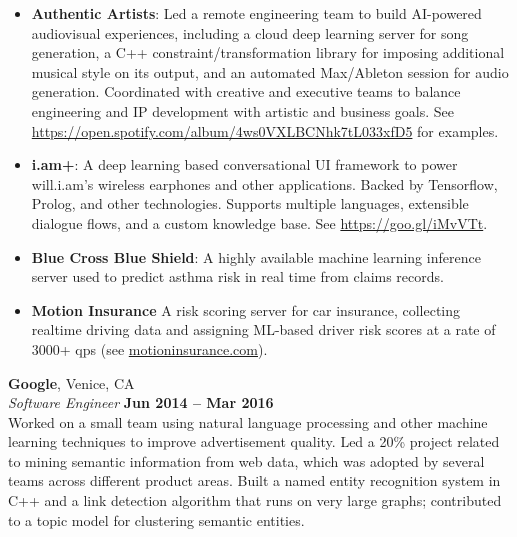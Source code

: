 \documentclass[margin,line]{resume}
\begin{document}
\begin{resume}
    \begin{itemize}

    \item \textbf{Authentic Artists}: Led a remote engineering team to build AI-powered audiovisual
      experiences, including a cloud deep learning server for song generation, a
      C++ constraint/transformation library for imposing additional musical style
      on its output, and an automated Max/Ableton session for audio generation.
      Coordinated with creative and executive teams to balance engineering and IP
      development with artistic and business goals. See
      \url{https://open.spotify.com/album/4ws0VXLBCNhk7tL033xfD5} for examples.

    \item \textbf{i.am+}: A deep learning based conversational UI framework to power
      will.i.am's wireless earphones and other applications. Backed by
      Tensorflow, Prolog, and other technologies. Supports multiple languages,
      extensible dialogue flows, and a custom knowledge base. See
      \url{https://goo.gl/iMvVTt}.
    \item \textbf{Blue Cross Blue Shield}: A highly available machine learning
      inference server used to predict asthma risk in real time from claims
      records.
    \item \textbf{Motion Insurance} A risk scoring server for car insurance,
      collecting realtime driving data and assigning ML-based
      driver risk scores at a rate of 3000+ qps (see \url{motioninsurance.com}).

    \end{itemize}


    \textbf{Google}, Venice, CA \vspace{2mm}\\\vspace{1mm}%
    \textsl{Software Engineer} \hfill \textbf{Jun 2014 -- Mar 2016}\\
    Worked on a small team using natural language processing and other machine
    learning techniques to improve advertisement quality. Led a 20\% project
    related to mining semantic information from web data, which was adopted by
    several teams across different product areas. Built a named entity
    recognition system in C++ and a link detection algorithm that runs on very
    large graphs; contributed to a topic model for clustering semantic entities.


\end{resume}
\end{document}
